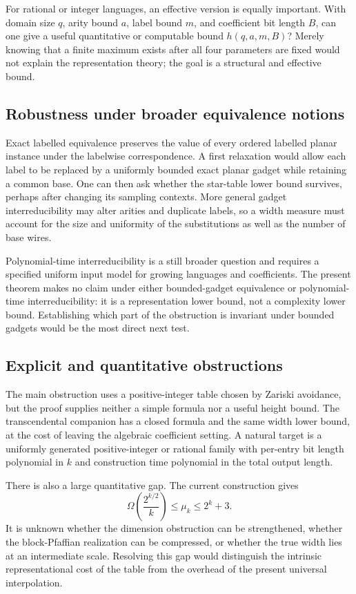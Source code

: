 \documentclass[11pt]{article}
\theoremstyle{definition}
\theoremstyle{remark}
\begin{document}
For rational or integer languages, an effective version is equally
important.  With domain size $q$, arity bound $a$, label bound $m$, and
coefficient bit length $B$, can one give a useful quantitative or computable
bound $h(q,a,m,B)$?  Merely knowing that a finite maximum exists after all
four parameters are fixed would not explain the representation theory; the
goal is a structural and effective bound.

\subsection{Robustness under broader equivalence notions}

Exact labelled equivalence preserves the value of every ordered labelled
planar instance under the labelwise correspondence.  A first relaxation
would allow each label to
be replaced by a uniformly bounded exact planar gadget while retaining a
common base.  One can then ask whether the star-table lower bound survives,
perhaps after changing its sampling contexts.  More general gadget
interreducibility may alter arities and duplicate labels, so a width measure
must account for the size and uniformity of the substitutions as well as the
number of base wires.

Polynomial-time interreducibility is a still broader question and requires a
specified uniform input model for growing languages and coefficients.  The
present theorem makes no claim under either bounded-gadget equivalence or
polynomial-time interreducibility: it is a representation lower bound, not a
complexity lower bound.  Establishing which part of the obstruction is
invariant under bounded gadgets would be the most direct next test.

\subsection{Explicit and quantitative obstructions}

The main obstruction uses a positive-integer table chosen by Zariski
avoidance, but the proof supplies neither a simple formula nor a useful height
bound.  The transcendental companion has a closed formula and the same width
lower bound, at the cost of leaving the algebraic coefficient setting.  A
natural target is a uniformly generated positive-integer or rational family
with per-entry bit length polynomial in $k$ and construction time polynomial
in the total output length.

There is also a large quantitative gap.  The current construction gives
\[
  \Omega\!\left(\frac{2^{k/2}}{k}\right)
  \le \mu_k \le 2^k+3.
\]
It is unknown whether the dimension obstruction can be strengthened, whether
the block-Pfaffian realization can be compressed, or whether the true width
lies at an intermediate scale.  Resolving this gap would distinguish the
intrinsic representational cost of the table from the overhead of the present
universal interpolation.
\end{document}

